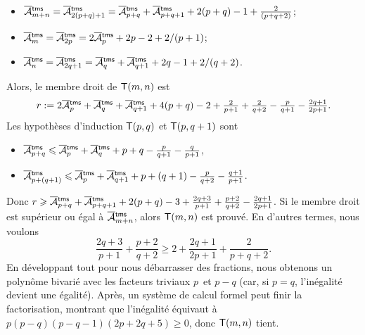 \begin{enumerate}
\begin{itemize}
      \item \(\OM{\fun{tms}}{m+n} = \OM{\fun{tms}}{2(p+q)+1} =
        \OM{\fun{tms}}{p+q} + \OM{\fun{tms}}{p+q+1} + 2(p+q) - 1 +
        \tfrac{2}{(p+q+2)}\);

      \item \(\OM{\fun{tms}}{m} = \OM{\fun{tms}}{2p} =
        2\OM{\fun{tms}}{p} + 2p - 2 + 2/(p+1)\);

      \item \(\OM{\fun{tms}}{n} = \OM{\fun{tms}}{2q+1} =
        \OM{\fun{tms}}{q} + \OM{\fun{tms}}{q+1} + 2q - 1 + 2/(q+2)\).

    \end{itemize}
    Alors, le membre droit de \(\textsf{T}({m,n})\) est
    \begin{equation*}
      r := 2\OM{\fun{tms}}{p} + \OM{\fun{tms}}{q} +
      \OM{\fun{tms}}{q+1} + 4(p+q) - 2 + \tfrac{2}{p+1} +
      \tfrac{2}{q+2} - \tfrac{p}{q+1} - \tfrac{2q+1}{2p+1}.
    \end{equation*}
    Les hypothèses d'induction \(\textsf{T}({p,q})\) et
    \(\textsf{T}({p,q+1})\) sont
    \begin{itemize}

      \item \(\OM{\fun{tms}}{p+q} \leqslant \OM{\fun{tms}}{p} +
      \OM{\fun{tms}}{q} + p + q - \frac{p}{q+1} - \frac{q}{p+1}\),

      \item \(\OM{\fun{tms}}{p+(q+1)} \leqslant \OM{\fun{tms}}{p} +
      \OM{\fun{tms}}{q+1} + p + (q + 1) - \frac{p}{q+2} -
      \frac{q+1}{p+1}\).

    \end{itemize}
    Donc \(r \geqslant \OM{\fun{tms}}{p+q} + \OM{\fun{tms}}{p+q+1} +
    2(p+q) - 3 + \tfrac{2q+3}{p+1} + \tfrac{p+2}{q+2} -
    \tfrac{2q+1}{2p+1}\). Si le membre droit est supérieur ou égal à
    \(\OM{\fun{tms}}{m+n}\), alors \(\textsf{T}({m,n})\) est prouvé.  En
    d'autres termes, nous voulons
    \begin{equation*}
      \frac{2q+3}{p+1} + \frac{p+2}{q+2} \geqslant 2 +
      \frac{2q+1}{2p+1} + \frac{2}{p+q+2}.
    \end{equation*}
    En développant tout pour nous débarrasser des fractions, nous
    obtenons un polynôme bivarié avec les facteurs triviaux \(p\)~et
    \(p-q\) (car, si \(p=q\), l'inégalité devient une égalité). Après,
    un système de calcul formel peut finir la factorisation, montrant
    que l'inégalité équivaut à \(p(p-q)(p-q-1)(2p+2q+5) \geqslant 0\),
    donc \(\textsf{T}({m,n})\) tient.


\end{enumerate}
